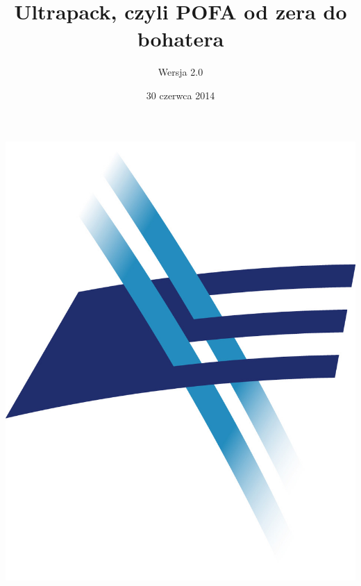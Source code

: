 \documentclass[a4paper, 10pt, ]{article}
\title{Ultrapack, czyli POFA od zera do bohatera}
\author{Wersja 2.0}
\date{30 czerwca 2014}
\begin{document}
\maketitle
\begin{center}
	\includegraphics{images/logo}
\end{center}

\thispagestyle{empty}
\newpage
\section*{ }

\newpage
\end{document}
